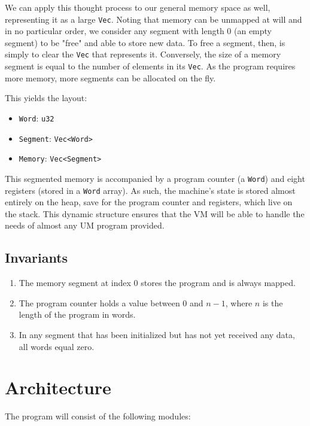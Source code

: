 \documentclass{article}
\begin{document}
We can apply this thought process to our general memory space as well, representing it as a large \verb|Vec|.
Noting that memory can be unmapped at will and in no particular order, we consider any segment with length 0 (an empty segment) to be "free" and able to store new data.
To free a segment, then, is simply to clear the \verb|Vec| that represents it.
Conversely, the size of a memory segment is equal to the number of elements in its \verb|Vec|.
As the program requires more memory, more segments can be allocated on the fly.

This yields the layout:

\begin{itemize}
    \item \verb|Word|: \verb|u32|
    \item \verb|Segment|: \verb|Vec<Word>|
    \item \verb|Memory|: \verb|Vec<Segment>|
\end{itemize}

This segmented memory is accompanied by a program counter (a \verb|Word|) and eight registers (stored in a \verb|Word| array).
As such, the machine's state is stored almost entirely on the heap, save for the program counter and registers, which live on the stack.
This dynamic structure ensures that the VM will be able to handle the needs of almost any UM program provided.

\subsection{Invariants}

\begin{enumerate}
    \item The memory segment at index 0 stores the program and is always mapped.
    \item The program counter holds a value between 0 and $n - 1$, where $n$ is the length of the program in words.
    \item In any segment that has been initialized but has not yet received any data, all words equal zero.
\end{enumerate}

\section{Architecture}

The program will consist of the following modules:
\end{document}
